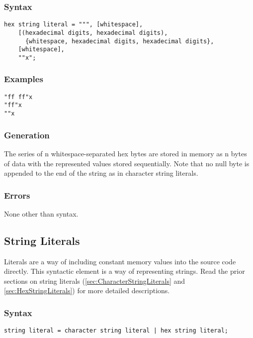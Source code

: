 \documentclass[10pt,a4paper]{article}
\begin{document}
\subsubsection{Syntax}
\begin{verbatim}
hex string literal = """, [whitespace], 
    [(hexadecimal digits, hexadecimal digits), 
      {whitespace, hexadecimal digits, hexadecimal digits}, 
    [whitespace], 
    ""x";
\end{verbatim}

\subsubsection{Examples}
\begin{verbatim}
"ff ff"x
"ff"x
""x
\end{verbatim}

\subsubsection{Generation}
The series of n whitespace-separated hex bytes are stored in memory as n bytes of data with the represented values stored sequentially. Note that no null byte is appended to the end of the string as in character string literals.

\subsubsection{Errors}
None other than syntax.

\newpage




\subsection{String Literals}
\label{sec:StringLiterals}
Literals are a way of including constant memory values into the source code directly. This syntactic element is a way of representing strings. Read the prior sections on string literals (\ref{sec:CharacterStringLiterals} and \ref{sec:HexStringLiterals}) for more detailed descriptions.

\subsubsection{Syntax}
\begin{verbatim}
string literal = character string literal | hex string literal;
\end{verbatim}
\end{document}
